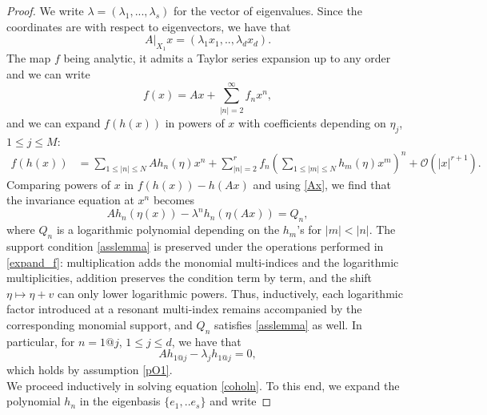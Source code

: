\documentclass{amsart}
\newcommand{\rev}[1]{\textcolor{blue}{#1}}
\theoremstyle{plain}
\theoremstyle{definition}
\begin{document}
\begin{proof}

We write $\lambda=(\lambda_1,...,\lambda_s)$ for the vector of eigenvalues. Since the coordinates are with respect to eigenvectors, we have that
\begin{equation}\label{Ax}
A|_{X_1}x=(\lambda_1x_1,..,\lambda_dx_d).
\end{equation}
The map $f$ being analytic, it admits a Taylor series expansion up to any order and we can write 
\begin{equation}
f(x)=Ax+\sum_{|n|= 2}^\infty f_n x^n,
\end{equation}
and we can expand $f(h(x))$ in powers of $x$ with coefficients depending on $\eta_j$, $1\leq j\leq M$: 
\begin{equation}\label{expand_f}
\begin{split}
f(h(x))&=\sum_{1\leq |n|\leq N} Ah_n(\eta)x^n+\sum_{|n|= 2}^r f_n \left(\sum_{1\leq |m|\leq N} h_m(\eta)x^m\right)^n+\mathcal{O}(|x|^{r+1}).
\end{split}
\end{equation}
Comparing powers of $x$ in $f(h(x))-h(Ax)$ and using \eqref{Ax}, we find that the invariance equation at $x^n$ becomes
\begin{equation}\label{coholn}
Ah_n(\eta(x))-\lambda^nh_n(\eta(Ax))=Q_n,
\end{equation}
where $Q_n$ is a logarithmic polynomial depending on the $h_m$'s for $|m|<|n|$. The support condition \eqref{asslemma} is preserved under the operations performed in \eqref{expand_f}: multiplication adds the monomial multi-indices and the logarithmic multiplicities, addition preserves the condition term by term, and the shift $\eta\mapsto\eta+v$ can only lower logarithmic powers. Thus, inductively, each logarithmic factor introduced at a resonant multi-index remains accompanied by the corresponding monomial support, and $Q_n$ satisfies \eqref{asslemma} as well. 
In particular, for $n=1@j$, $1\leq j\leq d$, we have that
\begin{equation}
Ah_{1@j}-\lambda_jh_{1@j}=0,
\end{equation}
which holds by assumption \eqref{pO1}.\\
We proceed inductively in solving equation \eqref{coholn}. To this end, we expand the polynomial $h_n$ in the eigenbasis $\{e_1,..e_s\}$ and write

\end{proof}
\end{document}
